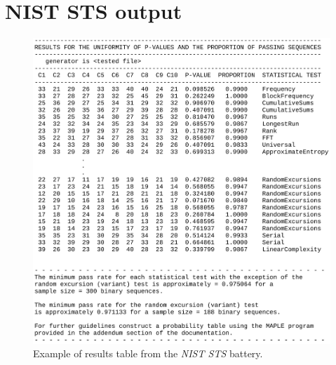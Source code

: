 \documentclass[
  digital,     %
  oneside,     %
  nosansbold,  %
  nocolorbold, %
  nolof,         %
  nolot,         %
]{fithesis4}
\begin{document}
\pagebreak

\section{NIST STS output} \label{append:nist-output}
\begin{figure}[H]
  \begin{center}
    \includegraphics[width=12.5cm]{figures/outputs-appendix/finalAnalysisReport.jpg}
  \end{center}
  \caption{Example of results table from the \emph{NIST STS} battery.}
  \label{fig:nist_tab}
\end{figure}

\pagebreak
\end{document}
